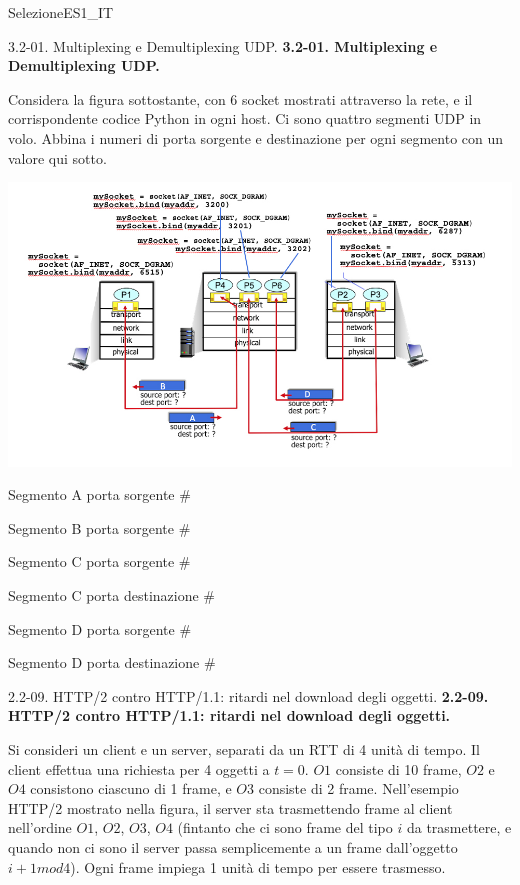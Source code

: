 \documentclass[a4paper]{article}
\begin{document}
\begin{quiz}{SelezioneES1\_IT}
\begin{matching}[points=1,shuffle]{3.2-01. Multiplexing e Demultiplexing UDP.}
\textbf{3.2-01. Multiplexing e Demultiplexing UDP.} 

Considera la figura sottostante, con 6 socket mostrati attraverso la rete, e il corrispondente codice Python in ogni host. Ci sono quattro segmenti UDP in volo. Abbina i numeri di porta sorgente e destinazione per ogni segmento con un valore qui sotto.

\begin{center}
\includegraphics[width=\linewidth]{figs/fig1.jpg}
\end{center}
\item Segmento A porta sorgente \# 
\item Segmento B porta sorgente \# 
\item Segmento C porta sorgente \# 
\item Segmento C porta destinazione \# 
\item Segmento D porta sorgente \# 
\item Segmento D porta destinazione \# 
\end{matching}

\begin{multi}[points=1]{2.2-09. HTTP/2 contro HTTP/1.1: ritardi nel download degli oggetti.}
\textbf{2.2-09. HTTP/2 contro HTTP/1.1: ritardi nel download degli oggetti.}

Si consideri un client e un server, separati da un RTT di 4 unità di tempo. Il client effettua una richiesta per 4 oggetti a $t=0$. $O1$ consiste di 10 frame, $O2$ e $O4$ consistono ciascuno di 1 frame, e $O3$ consiste di 2 frame. Nell'esempio HTTP/2 mostrato nella figura, il server sta trasmettendo frame al client nell'ordine $O1$, $O2$, $O3$, $O4$ (fintanto che ci sono frame del tipo $i$ da trasmettere, e quando non ci sono il server passa semplicemente a un frame dall'oggetto $i+1 mod 4$). Ogni frame impiega 1 unità di tempo per essere trasmesso.


\end{multi}
\end{quiz}
\end{document}
